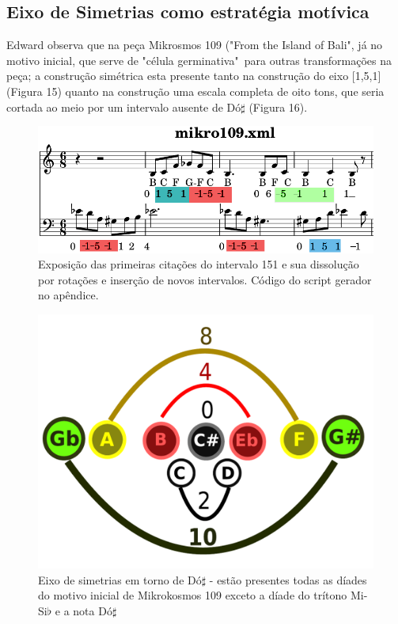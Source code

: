 \documentclass[
	12pt,				%
	openright,			%
	twoside,			%
	a4paper,			%
	english,			%
	french,				%
	spanish,			%
	brazil				%
	]{abntex2}
\begin{document}
\subsection{Eixo de Simetrias como estratégia motívica}

Edward  observa que na peça Mikrosmos 109 ("From the Island of Bali", já no motivo inicial, que serve de "célula germinativa"\ para outras transformações na peça; a construção simétrica esta presente tanto na construção do eixo [1,5,1] (Figura 15) quanto na construção uma escala completa de oito tons, que seria cortada ao meio por um intervalo ausente de Dó$\sharp$ (Figura 16).

\begin{figure}[!h]
	\caption{\label{fig_grafico}Exposição das primeiras citações do intervalo 151 e sua dissolução por rotações e inserção de novos intervalos. Código do script gerador no apêndice.}
	\begin{center}
	    \includegraphics[scale=0.4]{estudosM21/contornoM109.png}
	\end{center}
\end{figure}

\begin{figure}[!h]
	\caption{\label{fig_grafico}Eixo de simetrias em torno de Dó$\sharp$ - estão presentes todas as díades do motivo inicial de Mikrokosmos 109 exceto a díade do trítono Mi-Si$\flat $ e a nota Dó$\sharp$}
	\begin{center}
	    \includegraphics[scale=0.4]{axis/simetriamikro109.pdf}
	\end{center}
\end{figure}
\end{document}
